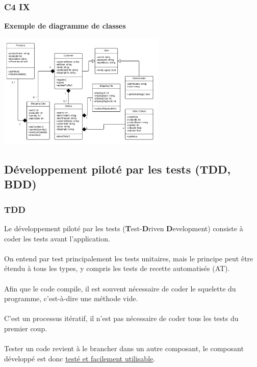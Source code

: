 \begin{frame}
	\frametitle{C4 IX}

    \textbf{Exemple de diagramme de classes}\\
    \centerline{\includegraphics[width=8cm]{img/class_diagram.jpg}}
\end{frame}

\subsection{D\'{e}veloppement pilot\'{e} par les tests (TDD, BDD)}
\begin{frame}
	\frametitle{TDD}
    Le d\'{e}veloppement pilot\'{e} par les tests (\textbf{T}est-\textbf{D}riven \textbf{D}evelopment) consiste \`{a} coder les tests avant l'application.
    \\~\\
    On entend par test principalement les tests unitaires, mais le principe peut \^{e}tre \'{e}tendu \`{a} tous les types, y compris les tests de recette automatis\'{e}s (AT).
    \\~\\
    Afin que le code compile, il est souvent n\'{e}cessaire de coder le squelette du programme, c'est-\`{a}-dire une m\'{e}thode vide.
    \\~\\
    C'est un processus it\'{e}ratif, il n'est pas n\'{e}cessaire de coder tous les tests du premier coup.
    \\~\\
    Tester un code revient \`{a} le brancher dans un autre composant, le composant d\'{e}velopp\'{e} est donc \underline{test\'{e} et facilement utilisable}.
\end{frame}

